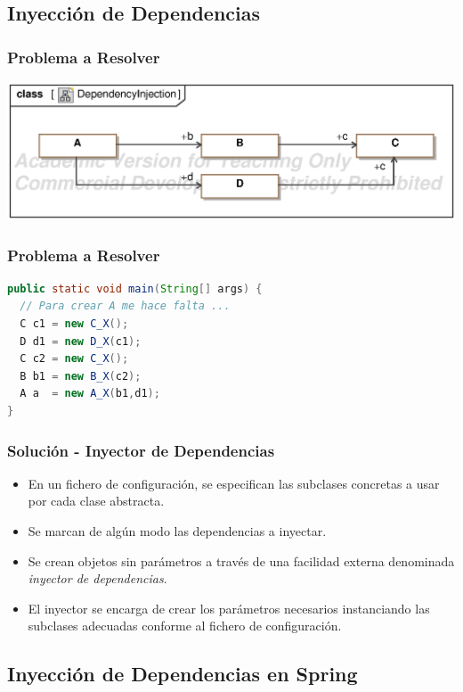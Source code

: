 \documentclass[handout,a4paper,t,xcolor=pst,dvips,colortheme]{beamer}
\begin{document}
\subsection{Inyección de Dependencias}

\begin{frame}[c]
	\frametitle{Problema a Resolver}
	\begin{center}
        \includegraphics[width=\linewidth,keepaspectratio=true]{images/iod/DependencyInjection.eps}
	\end{center}
\end{frame}

\begin{frame}[c,fragile]
	\frametitle{Problema a Resolver}
\begin{lstlisting}[basicstyle=\footnotesize,language=Java]
public static void main(String[] args) {
  // Para crear A me hace falta ...
  C c1 = new C_X();
  D d1 = new D_X(c1);
  C c2 = new C_X();
  B b1 = new B_X(c2);
  A a  = new A_X(b1,d1);
}
\end{lstlisting}
\end{frame}

\begin{frame}[c]
	\frametitle{Solución - Inyector de Dependencias}
    \begin{itemize}[<+->]
        \item En un fichero de configuración, se especifican las subclases concretas a usar por cada clase abstracta.
        \item Se marcan de algún modo las dependencias a inyectar.
        \item Se crean objetos \alert{sin parámetros} a través de una facilidad externa denominada \emph{inyector de dependencias}.
        \item El inyector se encarga de crear los parámetros necesarios instanciando las subclases adecuadas conforme al fichero de configuración.
    \end{itemize}
\end{frame}

\subsection{Inyección de Dependencias en Spring}
\end{document}
